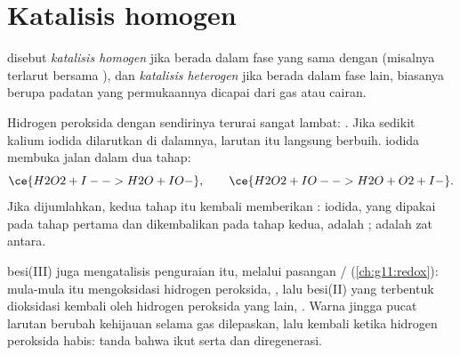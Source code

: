 \section{Katalisis homogen}

\begin{definition}\label{def:g12:catalysis:homogeneous}
 disebut \emph{katalisis homogen}
jika  berada dalam fase yang sama dengan  (misalnya
terlarut bersama ), dan \emph{katalisis
heterogen} jika  berada dalam fase
lain, biasanya berupa padatan yang permukaannya dicapai  dari
gas atau cairan.
\end{definition}

\begin{example}\label{ex:g12:catalysis:iodide}
Hidrogen peroksida dengan sendirinya terurai sangat lambat:
. Jika sedikit kalium iodida dilarutkan di
dalamnya, larutan itu langsung berbuih.  iodida membuka jalan dalam
dua tahap:
\[
  \ce{H2O2 + I- -> H2O + IO-}, \qquad
  \ce{H2O2 + IO- -> H2O + O2 + I-} .
\]
Jika dijumlahkan, kedua tahap itu kembali memberikan
:  iodida, yang dipakai pada tahap pertama dan
dikembalikan pada tahap kedua, adalah ;   adalah
zat antara.
\end{example}


\begin{example}\label{ex:g12:catalysis:iron}
 besi(III) juga mengatalisis penguraian itu, melalui pasangan
/ (\cref{ch:g11:redox}): mula-mula  itu
mengoksidasi hidrogen peroksida,
, lalu  besi(II) yang
terbentuk dioksidasi kembali oleh hidrogen peroksida yang lain,
. Warna jingga pucat
larutan berubah kehijauan selama gas dilepaskan, lalu kembali ketika
hidrogen peroksida habis: tanda bahwa  ikut serta dan
diregenerasi.
\end{example}

